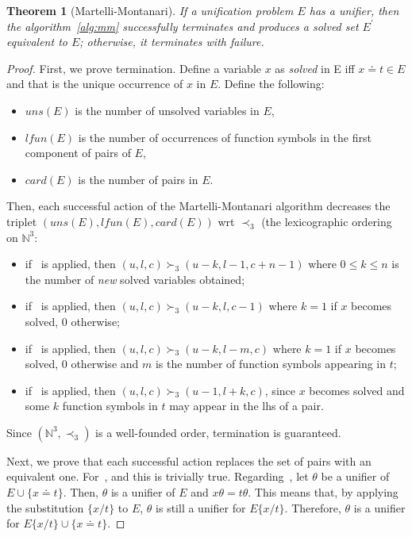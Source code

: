 \documentclass{report}
\theoremstyle{definition}
\theoremstyle{plain}
\newtheorem{thm}{Theorem}[section]
\theoremstyle{remark}
\begin{document}
\begin{thm}[Martelli-Montanari]
    If a unification problem \(E\) has a unifier, then the algorithm~\ref{alg:mm} successfully terminates and produces a solved set \(E^\prime\) equivalent to \(E\); otherwise, it terminates with failure.
\end{thm}
\begin{proof}
    First, we prove termination.
    Define a variable \(x\) as \emph{solved} in E iff \(x \doteq t \in E\) and that is the unique occurrence of \(x\) in \(E\).
    Define the following:
    \begin{itemize}
        \item \(uns(E)\) is the number of unsolved variables in \(E\),
        \item \(lfun(E)\) is the number of occurrences of function symbols in the first component of pairs of \(E\),
        \item \(card(E)\) is the number of pairs in \(E\).
    \end{itemize}
    Then, each successful action of the Martelli-Montanari algorithm decreases the triplet \((uns(E),lfun(E),card(E))\) wrt \(\prec_3\) (the lexicographic ordering on \(\mathbb{N}^3\):
    \begin{itemize}
        \item if~ is applied, then \((u,l,c) \succ_3 (u - k, l - 1, c + n - 1)\) where \(0 \le k \le n\) is the number of \emph{new} solved variables obtained;
        \item if~ is applied, then \((u,l,c) \succ_3 (u - k, l, c - 1)\) where \(k = 1\) if \(x\) becomes solved, \(0\) otherwise;
        \item if~ is applied, then \((u,l,c) \succ_3 (u - k, l - m, c)\) where \(k = 1\) if \(x\) becomes solved, \(0\) otherwise and \(m\) is the number of function symbols appearing in \(t\);
        \item if~ is applied, then \((u,l,c) \succ_3 (u - 1, l + k, c)\), since \(x\) becomes solved and some \(k\) function symbols in \(t\) may appear in the lhs of a pair.
    \end{itemize}
    Since \((\mathbb{N}^3,\prec_3)\) is a well-founded order, termination is guaranteed.

    Next, we prove that each successful action replaces the set of pairs with an equivalent one. For~,  and  this is trivially true.
    Regarding~, let \(\theta\) be a unifier of \(E \cup \lbrace x \doteq t \rbrace\). Then, \(\theta\) is a unifier of \(E\) and \(x\theta = t\theta\).
    This means that, by applying the substitution \(\lbrace x/t \rbrace\) to \(E\), \(\theta\) is still a unifier for \(E\lbrace x/t \rbrace\).
    Therefore, \(\theta\) is a unifier for \(E\lbrace x/t \rbrace \cup \lbrace x \doteq t \rbrace\).


\end{proof}
\end{document}
